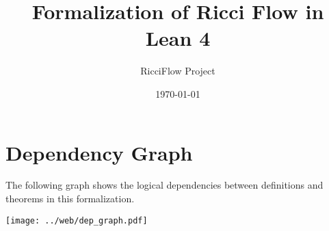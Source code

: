\documentclass[a4paper]{report}
\title{Formalization of Ricci Flow in Lean 4}
\author{RicciFlow Project}
\date{\today}
\theoremstyle{definition}
\theoremstyle{remark}
\begin{document}
\maketitle

\tableofcontents



\appendix

\chapter{Dependency Graph}
\label{app:dep-graph}

The following graph shows the logical dependencies between definitions and theorems in this formalization.

\begin{center}
\texttt{[image: ../web/dep\_graph.pdf]}
\end{center}
\end{document}
